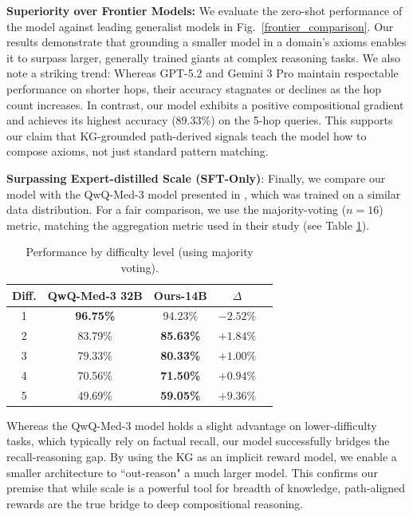 \documentclass{article}
\theoremstyle{plain}
\theoremstyle{definition}
\theoremstyle{remark}
\begin{document}
\textbf{Superiority over Frontier Models:} We evaluate the zero-shot performance of the model against leading generalist models in Fig.~\ref{frontier_comparison}. Our results demonstrate that grounding a smaller model in a domain's axioms enables it to surpass larger, generally trained giants at complex reasoning tasks. We also note a striking trend: Whereas GPT-5.2 and Gemini 3 Pro maintain respectable performance on shorter hops, their accuracy stagnates or declines as the hop count increases. In contrast, our model exhibits a positive compositional gradient and achieves its highest accuracy (89.33\%) on the 5-hop queries. This supports our claim that KG-grounded path-derived signals teach the model how to compose axioms, not just standard pattern matching.

\textbf{Surpassing Expert-distilled Scale (SFT-Only)}: Finally, we compare our model with the QwQ-Med-3 model presented in \cite{Dedhia2025Bottom-upNeed}, which was trained on a similar data distribution. For a fair comparison, we use the majority-voting ($n=16$) metric, matching the aggregation metric used in their study (see Table \ref{tab:difficulty}).

\begin{table}[ht]
\caption{Performance by difficulty level (using majority voting).}
\label{tab:difficulty}
\vskip 0.15in
\begin{center}
\begin{small}
\begin{sc}
\begin{tabular}{ccccc}
\toprule
Diff. & QwQ-Med-3 32B & Ours-14B & $\Delta$ \\
\midrule
1 & \textbf{96.75\%} & 94.23\% & $-2.52\%$ \\
2 & 83.79\% & \textbf{85.63\%} & $+1.84\%$ \\
3 & 79.33\% & \textbf{80.33\%} & $+1.00\%$ \\
4 & 70.56\% & \textbf{71.50\%} & $+0.94\%$ \\
5 & 49.69\% & \textbf{59.05\%} & $+9.36\%$ \\
\bottomrule
\end{tabular}
\end{sc}
\end{small}
\end{center}
\end{table}

Whereas the QwQ-Med-3 model holds a slight advantage on lower-difficulty tasks, which typically rely on factual recall, our model successfully bridges the recall-reasoning gap. By using the KG as an implicit reward model, we enable a smaller architecture to ``out-reason" a much larger model. This confirms our premise that while scale is a powerful tool for breadth of knowledge, path-aligned rewards are the true bridge to deep compositional reasoning.
\end{document}
